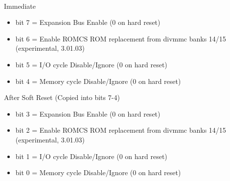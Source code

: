 \\
Immediate
\begin{itemize}
\item bit 7 = Expansion Bus Enable (0 on hard reset)
\item bit 6 = Enable ROMCS ROM replacement from divmmc banks 14/15
  (experimental, 3.01.03)
\item bit 5 = I/O cycle Disable/Ignore  (0 on
  hard reset)
\item bit 4 = Memory cycle Disable/Ignore  (0 on
  hard reset)
\end{itemize}
After Soft Reset (Copied into bits 7-4)
\begin{itemize}
\item bit 3 = Expansion Bus Enable (0 on hard reset)
\item bit 2 = Enable ROMCS ROM replacement from divmmc banks 14/15
  (experimental, 3.01.03)
\item bit 1 = I/O cycle Disable/Ignore  (0 on
  hard reset)
\item bit 0 = Memory cycle Disable/Ignore  (0 on
  hard reset)
\end{itemize}

